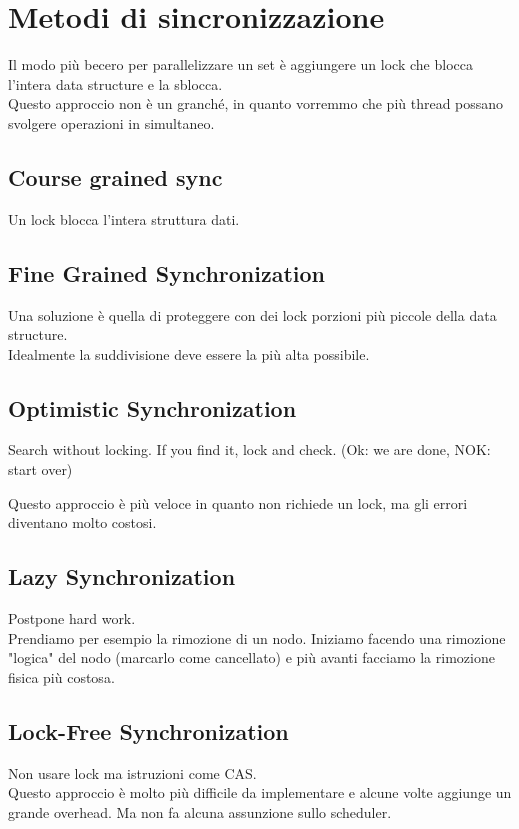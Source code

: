 \documentclass{article}
\begin{document}
\section{Metodi di sincronizzazione}
Il modo più becero per parallelizzare un set è aggiungere un lock che blocca l'intera data structure e la sblocca.\\
Questo approccio non è un granché, in quanto vorremmo che più thread possano svolgere operazioni in simultaneo.

\subsection{Course grained sync}
Un lock blocca l'intera struttura dati.

\subsection{Fine Grained Synchronization}
Una soluzione è quella di proteggere con dei lock porzioni più piccole della data structure. \\
Idealmente la suddivisione deve essere la più alta possibile.

\subsection{Optimistic Synchronization}
Search without locking. If you find it, lock and check. (Ok: we are done, NOK: start over)

Questo approccio è più veloce in quanto non richiede un lock, ma gli errori diventano molto costosi.

\subsection{Lazy Synchronization}
Postpone hard work.\\
Prendiamo per esempio la rimozione di un nodo.
Iniziamo facendo una rimozione "logica" del nodo (marcarlo come cancellato) e più avanti facciamo la rimozione fisica più costosa.

\subsection{Lock-Free Synchronization}
Non usare lock ma istruzioni come CAS.\\
Questo approccio è molto più difficile da implementare e alcune volte aggiunge un grande overhead. Ma non fa alcuna assunzione sullo scheduler.
\end{document}
